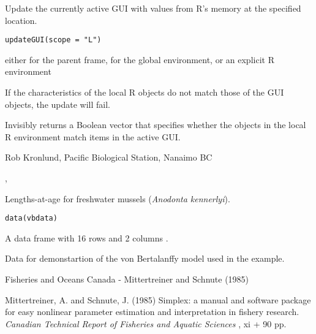\documentclass[letterpaper]{book}
\begin{document}
\begin{Description}\relax
Update the currently active GUI with values from R's memory at the specified location.
\end{Description}
\begin{Usage}
\begin{verbatim}
updateGUI(scope = "L")
\end{verbatim}
\end{Usage}
\begin{Arguments}
\begin{ldescription}
\item[\code{scope}] either  for the parent frame,  for the global environment,
or an explicit R environment
\end{ldescription}
\end{Arguments}
\begin{Details}\relax
If the characteristics of the local R objects do not match those of the GUI objects,
the update will fail.
\end{Details}
\begin{Value}
Invisibly returns a Boolean vector that specifies whether the objects in the local R
environment match items in the active GUI.
\end{Value}
\begin{Author}\relax
Rob Kronlund, Pacific Biological Station, Nanaimo BC
\end{Author}
\begin{SeeAlso}\relax
{}, 
\end{SeeAlso}

\begin{Description}\relax
Lengths-at-age for freshwater mussels (\emph{Anodonta kennerlyi}).
\end{Description}
\begin{Usage}
\begin{verbatim}data(vbdata)\end{verbatim}
\end{Usage}
\begin{Format}\relax
A data frame with 16 rows and 2 columns .
\end{Format}
\begin{Details}\relax
Data for demonstartion of the von Bertalanffy model used in the 
 example.
\end{Details}
\begin{Source}\relax
Fisheries and Oceans Canada - Mittertreiner and Schnute (1985)
\end{Source}
\begin{References}\relax
Mittertreiner, A. and Schnute, J. (1985) Simplex: a manual and software package 
for easy nonlinear parameter estimation and interpretation in fishery research. 
\emph{Canadian Technical Report of Fisheries and Aquatic Sciences} , xi + 90 pp.
\end{References}
\end{document}
